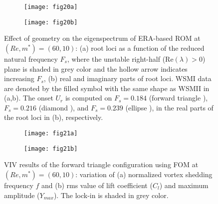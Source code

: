 \documentclass{jfm}
\newcommand{\reddashdot}{\raisebox{2pt}{\tikz{\draw[red,dashdotted,line width=1.2pt](0,0) -- (5mm,0);}}}
\newcommand{\bluedashdot}{\raisebox{2pt}{\tikz{\draw[blue,dashdotted,line width=1.2pt](0,0) -- (5mm,0);}}}
\newcommand{\greendashdot}{\raisebox{2pt}{\tikz{\draw[green,dashdotted,line width=1.2pt](0,0) -- (5mm,0);}}}
\begin{document}
 
\begin{figure}
\centering
\begin{subfigure}{0.495\textwidth}
\centering
    \texttt{[image: fig20a]}
    \caption{}
    \label{fig:topology1_eig1}
    \end{subfigure} 
\begin{subfigure}{0.495\textwidth} 
\centering
 \texttt{[image: fig20b]}
	\caption{}
	\label{fig:topology1_eig23}
	\end{subfigure}	
        \caption{Effect of geometry on the eigenspectrum of ERA-based ROM at $(Re,m^*)=(60,10)$: 
        (a) root loci as a function of the reduced natural frequency $F_s$, 
         where the unstable right-half (Re$(\lambda) > 0$) plane is shaded in grey color  
         and the hollow arrow indicates increasing $F_s$, 
         (b) real and imaginary parts of root loci. 
          WSMI data are denoted by the filled symbol with the same shape as WSMII in (a,b).  
          The onset $U_r$ is computed on $F_s=0.184$ (forward triangle {\protect\bluedashdot}),
           $F_s=0.216$ (diamond {\protect\reddashdot}), and $F_s=0.239$ (ellipse {\protect\greendashdot}), in the real parts of the 
           root loci in (b), respectively.}
	\label{fig:topology1}
\end{figure}


 
 \begin{figure}
\centering
\begin{subfigure}{0.495\textwidth}
\centering
    \texttt{[image: fig21a]}
    \caption{}
    \label{fig:train1_y}
    \end{subfigure} 
\begin{subfigure}{0.495\textwidth} 
\centering
 \texttt{[image: fig21b]}
	\caption{}
	\label{fig:train1_f}
	\end{subfigure}	
        \caption{VIV results of the forward triangle configuration using 
        FOM at $(Re,m^*)=(60,10)$: variation of 
      (a) normalized vortex shedding frequency $f$ and 
      (b) rms value of lift coefficient ($C_l$) and maximum amplitude ($Y_{max}$).
      The lock-in is shaded in grey color.}
	\label{fig:trian1_re60_fem}
\end{figure}
\end{document}
